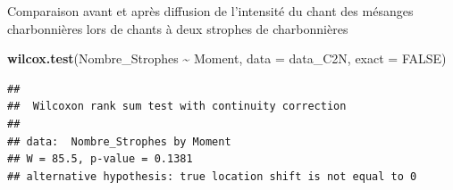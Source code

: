 \documentclass[
  french,
]{article}
\newenvironment{Shaded}{\begin{snugshade}}{\end{snugshade}}
\newcommand{\AttributeTok}[1]{\textcolor[rgb]{0.13,0.29,0.53}{#1}}
\newcommand{\CommentTok}[1]{\textcolor[rgb]{0.56,0.35,0.01}{\textit{#1}}}
\newcommand{\ConstantTok}[1]{\textcolor[rgb]{0.56,0.35,0.01}{#1}}
\newcommand{\FunctionTok}[1]{\textcolor[rgb]{0.13,0.29,0.53}{\textbf{#1}}}
\newcommand{\NormalTok}[1]{#1}
\newcommand{\OtherTok}[1]{\textcolor[rgb]{0.56,0.35,0.01}{#1}}
\newcommand{\SpecialCharTok}[1]{\textcolor[rgb]{0.81,0.36,0.00}{\textbf{#1}}}
\newcommand{\StringTok}[1]{\textcolor[rgb]{0.31,0.60,0.02}{#1}}
\begin{document}
\begin{Shaded}
\end{Shaded}

Comparaison avant et après diffusion de l'intensité du chant des
mésanges charbonnières lors de chants à deux strophes de charbonnières

\begin{Shaded}
\begin{Highlighting}[]
\FunctionTok{wilcox.test}\NormalTok{(Nombre\_Strophes }\SpecialCharTok{\textasciitilde{}}\NormalTok{ Moment, }\AttributeTok{data =}\NormalTok{ data\_C2N, }\AttributeTok{exact =} \ConstantTok{FALSE}\NormalTok{)}
\end{Highlighting}
\end{Shaded}

\begin{verbatim}
## 
##  Wilcoxon rank sum test with continuity correction
## 
## data:  Nombre_Strophes by Moment
## W = 85.5, p-value = 0.1381
## alternative hypothesis: true location shift is not equal to 0
\end{verbatim}
\end{document}
